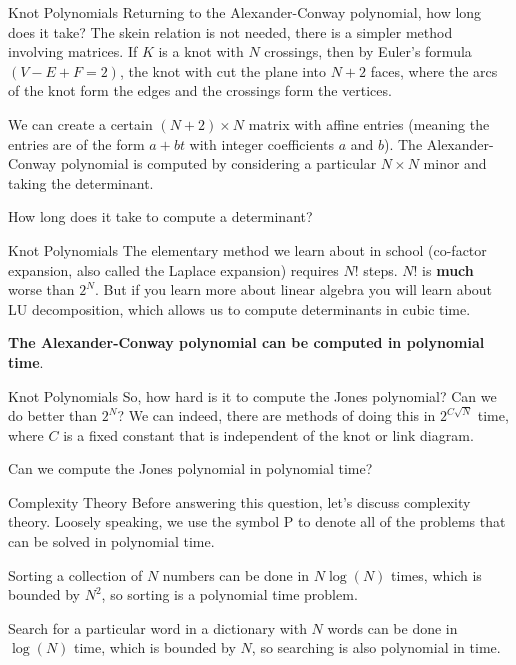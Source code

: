 \documentclass{beamer}
\begin{document}
    \begin{frame}{Knot Polynomials}
        Returning to the Alexander-Conway polynomial, how long does it take?
        The skein relation is not needed, there is a simpler method involving
        matrices. If $K$ is a knot with $N$ crossings, then by Euler's formula
        $(V-E+F=2)$, the knot with cut the plane into $N+2$ faces, where the
        arcs of the knot form the edges and the crossings form the vertices.
        \par\hfill\par
        We can create a certain $(N+2)\times{N}$ matrix with affine entries
        (meaning the entries are of the form $a+bt$ with integer coefficients
        $a$ and $b$). The Alexander-Conway polynomial is computed by
        considering a particular $N\times{N}$ minor and taking the determinant.
        \par\hfill\par
        How long does it take to compute a determinant?
    \end{frame}
    \begin{frame}{Knot Polynomials}
        The elementary method we learn about in school (co-factor expansion,
        also called the Laplace expansion) requires $N!$ steps. $N!$ is
        \textbf{much} worse than $2^{N}$. But if you learn more about linear
        algebra you will learn about LU decomposition, which allows us to
        compute determinants in cubic time.
        \par\hfill\par
        \textbf{The Alexander-Conway polynomial can be computed in polynomial}
        \textbf{time}.
    \end{frame}
    \begin{frame}{Knot Polynomials}
        So, how hard is it to compute the Jones polynomial? Can we do better
        than $2^{N}$? We can indeed, there are methods of doing this in
        $2^{C\sqrt{N}}$ time, where $C$ is a fixed constant that is independent
        of the knot or link diagram.
        \par\hfill\par
        Can we compute the Jones polynomial in polynomial time?
    \end{frame}
    \begin{frame}{Complexity Theory}
        Before answering this question, let's discuss complexity theory.
        Loosely speaking, we use the symbol $\textrm{P}$ to denote all of
        the problems that can be solved in polynomial time.
        \par\hfill\par
        Sorting a collection of $N$ numbers can be done in $N\log(N)$ times,
        which is bounded by $N^{2}$, so sorting is a polynomial time problem.
        \par\hfill\par
        Search for a particular word in a dictionary with $N$ words can be
        done in $\log(N)$ time, which is bounded by $N$, so searching is also
        polynomial in time.
    \end{frame}
\end{document}
